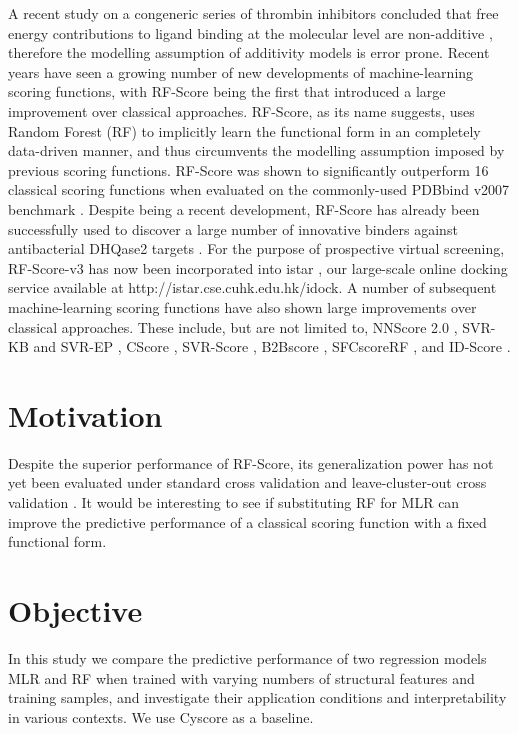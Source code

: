 A recent study on a congeneric series of thrombin inhibitors concluded that free energy contributions to ligand binding at the molecular level are non-additive \citep{1416}, therefore the modelling assumption of additivity models is error prone. Recent years have seen a growing number of new developments of machine-learning scoring functions, with RF-Score \citep{564} being the first that introduced a large improvement over classical approaches. RF-Score, as its name suggests, uses Random Forest (RF) \citep{1309} to implicitly learn the functional form in an completely data-driven manner, and thus circumvents the modelling assumption imposed by previous scoring functions. RF-Score was shown to significantly outperform 16 classical scoring functions when evaluated on the commonly-used PDBbind v2007 benchmark \citep{564}. Despite being a recent development, RF-Score has already been successfully used to discover a large number of innovative binders against antibacterial DHQase2 targets \citep{1281}. For the purpose of prospective virtual screening, RF-Score-v3 has now been incorporated into istar \citep{1362}, our large-scale online docking service available at http://istar.cse.cuhk.edu.hk/idock. A number of subsequent machine-learning scoring functions have also shown large improvements over classical approaches. These include, but are not limited to, NNScore 2.0 \citep{977}, SVR-KB and SVR-EP \citep{963}, CScore \citep{1194}, SVR-Score \citep{1295}, B2Bscore \citep{1410}, SFCscoreRF \citep{1347}, and ID-Score \citep{1305}.

\section{Motivation}

Despite the superior performance of RF-Score, its generalization power has not yet been evaluated under standard cross validation and leave-cluster-out cross validation \citep{774}. It would be interesting to see if substituting RF for MLR can improve the predictive performance of a classical scoring function with a fixed functional form.

\section{Objective}

In this study we compare the predictive performance of two regression models MLR and RF when trained with varying numbers of structural features and training samples, and investigate their application conditions and interpretability in various contexts. We use Cyscore as a baseline.

